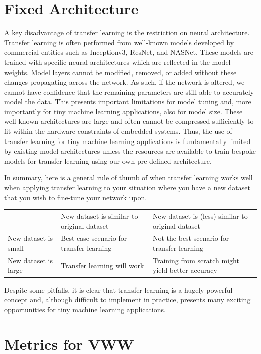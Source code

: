 \section{Fixed Architecture}

A key disadvantage of transfer learning is the restriction on neural architecture. Transfer learning is often performed from well-known models developed by commercial entities such as Inceptionv3, ResNet, and NASNet. These models are trained with specific neural architectures which are reflected in the model weights. Model layers cannot be modified, removed, or added without these changes propagating across the network. As such, if the network is altered, we cannot have confidence that the remaining parameters are still able to accurately model the data. This presents important limitations for model tuning and, more importantly for tiny machine learning applications, also for model size. These well-known architectures are large and often cannot be compressed sufficiently to fit within the hardware constraints of embedded systems. Thus, the use of transfer learning for tiny machine learning applications is fundamentally limited by existing model architectures unless the resources are available to train bespoke models for transfer learning using our own pre-defined architecture.

In summary, here is a general rule of thumb of when transfer learning works well when applying transfer learning to your situation where you have a new dataset that you wish to fine-tune your network upon. 

\begin{tabular}{lll}
    &New dataset is similar to original dataset &
New dataset is (less) similar to original dataset \\
New dataset is small &
Best case scenario for transfer learning&
Not the best scenario for transfer learning\\
New dataset is large &
Transfer learning will work&
Training from scratch might yield better accuracy\\
\end{tabular}

Despite some pitfalls, it is clear that transfer learning is a hugely powerful concept and, although difficult to implement in practice, presents many exciting opportunities for tiny machine learning applications.

\section{Metrics for VWW}

